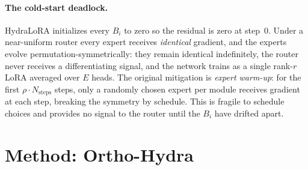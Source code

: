 \documentclass[10pt]{article}
\begin{document}
\paragraph{The cold-start deadlock.} HydraLoRA initializes every $B_i$
to zero so the residual is zero at step~$0$. Under a near-uniform
router every expert receives \emph{identical} gradient, and the
experts evolve permutation-symmetrically: they remain identical
indefinitely, the router never receives a differentiating signal, and
the network trains as a single rank-$r$ LoRA averaged over $E$ heads.
The original mitigation is \emph{expert warm-up}: for the first
$\rho \cdot N_{\mathrm{steps}}$ steps, only a randomly chosen expert
per module receives gradient at each step, breaking the symmetry by
schedule. This is fragile to schedule choices and provides no signal
to the router until the $B_i$ have drifted apart.

\section{Method: Ortho-Hydra}
\label{sec:method}
\end{document}

